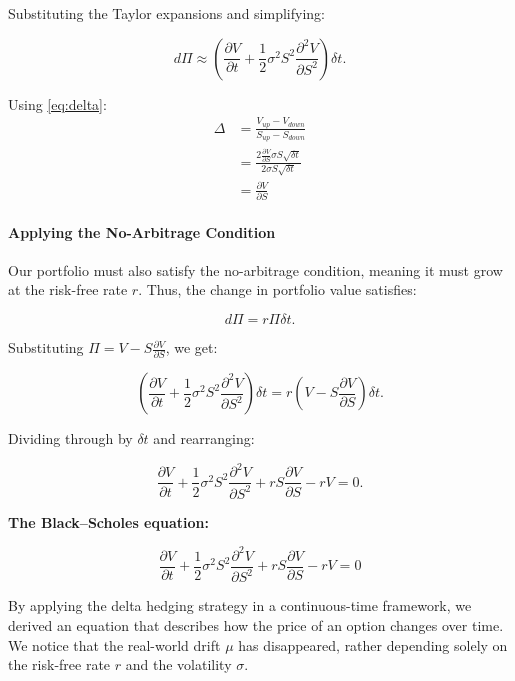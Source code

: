 \documentclass{article}
\begin{document}
Substituting the Taylor expansions and simplifying:

\[
    d\Pi \approx \left( \frac{\partial V}{\partial t} + \frac{1}{2} \sigma^2 S^2 \frac{\partial^2 V}{\partial S^2} \right) \delta t.
\]

Using \ref{eq:delta}:
\begin{align}
    \nonumber
    \Delta &= \frac{V_{up} - V_{down}}{S_{up} - S_{down}} \\
    \nonumber
    &= \frac{2 \frac{\partial V}{\partial S} \sigma S \sqrt{\delta t}}{2 \sigma S \sqrt{\delta t}} \\
    &= \frac{\partial V}{\partial S} \label{eq:risk_neutral_delta}
\end{align}


\paragraph{Applying the No-Arbitrage Condition}

Our portfolio must also satisfy the no-arbitrage condition, meaning it must grow at the risk-free rate $r$. Thus, the change in portfolio value satisfies:

\begin{equation}
    \label{eq:portfolio_no_arbitrage_condition}
    d\Pi = r \Pi \delta t.
\end{equation}

Substituting \( \Pi = V - S \frac{\partial V}{\partial S} \), we get:

\[
    \left( \frac{\partial V}{\partial t} + \frac{1}{2} \sigma^2 S^2 \frac{\partial^2 V}{\partial S^2} \right) \delta t = r \left( V - S \frac{\partial V}{\partial S} \right) \delta t.
\]

Dividing through by \( \delta t \) and rearranging:

\[
    \frac{\partial V}{\partial t} + \frac{1}{2} \sigma^2 S^2 \frac{\partial^2 V}{\partial S^2} + r S \frac{\partial V}{\partial S} - r V = 0.
\]

\bigskip

\noindent
\textbf{The Black–Scholes equation:}

\begin{equation}
    \label{eq:black_scholes}
    \boxed{\frac{\partial V}{\partial t} + \frac{1}{2} \sigma^2 S^2 \frac{\partial^2 V}{\partial S^2} + r S \frac{\partial V}{\partial S} - r V = 0}
\end{equation}

By applying the delta hedging strategy in a continuous-time framework, we derived an equation that describes how the price of an option changes over time.
We notice that the real-world drift \( \mu \) has disappeared, rather depending solely on the risk-free rate \( r \) and the volatility \( \sigma \).
\end{document}
